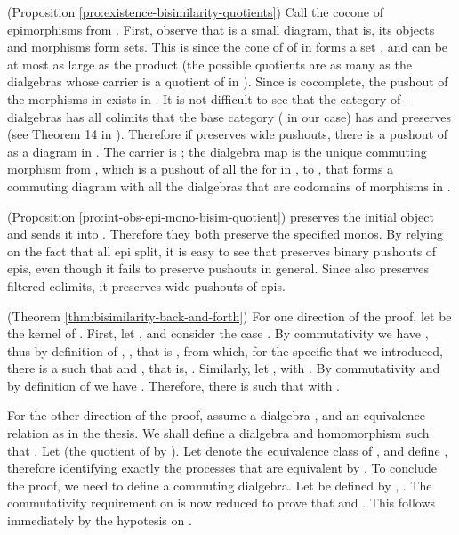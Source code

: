 \documentclass[orivec]{llncs}
\newcommand{\proend}{\medskip}
\renewenvironment{proof}{\begin{pro}}{\proend\end{pro}}
\begin{document}
\begin{proof}(Proposition \ref{pro:existence-bisimilarity-quotients})
  Call  the cocone of epimorphisms from . First, observe that  is a small diagram, that is, its objects and morphisms form sets. This is since the cone of of  in  forms a set , and  can be at most as large as the product  (the possible quotients are as many as the dialgebras whose carrier is a quotient of  in ). Since  is cocomplete, the pushout  of the morphisms in  exists in .  It is not difficult to see that the category of -dialgebras has all colimits that the base category ( in our case) has and  preserves (see Theorem 14 in \cite{Vou10}). Therefore if  preserves wide pushouts, there is a pushout  of  as a diagram in . The carrier is ; the dialgebra map  is the unique commuting morphism from , which is a pushout of all the  for  in , to , that forms a commuting diagram with all the dialgebras that are codomains of morphisms in .
\end{proof}

\begin{proof}(Proposition \ref{pro:int-obs-epi-mono-bisim-quotient})
	 preserves the initial object and  sends it into . Therefore they both preserve the specified monos.  By relying on the fact that all epi split, it is easy to see that  preserves binary pushouts of epis, even though it fails to preserve pushouts in general. Since  also preserves filtered colimits, it preserves wide pushouts of epis. 
\end{proof}




\begin{proof}(Theorem \ref{thm:bisimilarity-back-and-forth})
 For one direction of the proof, let  be the kernel of . First, let , and consider the case . By commutativity we have , thus by definition of , , that is , from which, for the specific  that we introduced, there is a  such that  and , that is, . Similarly, let , with . By commutativity and by definition of  we have . Therefore, there is  such that  with .
 
 For the other direction of the proof, assume a dialgebra , and an equivalence relation  as in the thesis. We shall define a dialgebra  and homomorphism  such that . Let  (the quotient of  by ). Let  denote the equivalence class of , and define , therefore identifying exactly the processes that are equivalent by . To conclude the proof, we need to define a commuting dialgebra. Let  be defined by , . The commutativity requirement on  is now reduced to prove that  and . This follows immediately by the hypotesis on .
\end{proof}
\end{document}
